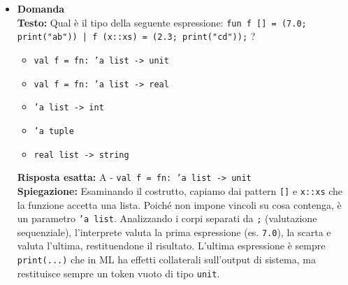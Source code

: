 \documentclass[12pt, a4paper]{article}
\newcounter{domandateoria}
\begin{document}
\begin{itemize}
    \item {}\textbf{Domanda \thedomandateoria} \\
    \textbf{Testo:} Qual è il tipo della seguente espressione: \texttt{fun f [] = (7.0; print("ab")) | f (x::xs) = (2.3; print("cd"));} ?
    \begin{itemize}
        \item[A)] \texttt{val f = fn: 'a list -> unit}
        \item[B)] \texttt{val f = fn: 'a list -> real}
        \item[C)] \texttt{'a list -> int}
        \item[D)] \texttt{'a tuple}
        \item[E)] \texttt{real list -> string}
    \end{itemize}
    \textbf{Risposta esatta:} A - \texttt{val f = fn: 'a list -> unit} \\
    \textbf{Spiegazione:} Esaminando il costrutto, capiamo dai pattern \texttt{[]} e \texttt{x::xs} che la funzione accetta una lista. Poiché non impone vincoli su cosa contenga, è un parametro \texttt{'a list}. Analizzando i corpi separati da \texttt{;} (valutazione sequenziale), l'interprete valuta la prima espressione (es. \texttt{7.0}), la scarta e valuta l'ultima, restituendone il risultato. L'ultima espressione è sempre \texttt{print(...)} che in ML ha effetti collaterali sull'output di sistema, ma restituisce sempre un token vuoto di tipo \texttt{unit}.
    \vspace{0.3cm}

\newpage


\end{itemize}
\end{document}
